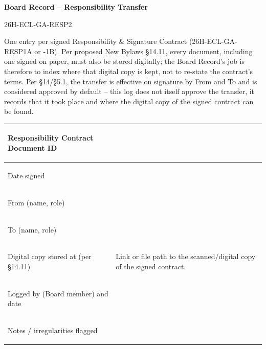 \documentclass{../../../Common/Latex/Templates/rapport}
\date{\meetingdate, \meetingtime}
\begin{document}
\reportmainmatter
\small
\setlength{\parindent}{0pt}
\setlength{\tabcolsep}{6pt}
\renewcommand{\arraystretch}{1.2}

\begin{center}
  {\Large\bfseries Board Record -- Responsibility Transfer}\par
  \vspace{0.15cm}
  {\normalsize 26H-ECL-GA-RESP2}\par
  \vspace{0.1cm}
  {\small \meetingline}\par
\end{center}

\vspace{0.2cm}
One entry per signed Responsibility \& Signature Contract (26H-ECL-GA-RESP1A or -1B). Per proposed New Bylaws \S14.11, every document, including one signed on paper, must also be stored digitally; the Board Record's job is therefore to index where that digital copy is kept, not to re-state the contract's terms. Per \S14/\S5.1, the transfer is effective on signature by From and To and is considered approved by default -- this log does not itself approve the transfer, it records that it took place and where the digital copy of the signed contract can be found.

\vspace{0.4cm}
\begin{tabularx}{\textwidth}{|>{\bfseries\raggedright\arraybackslash}p{4.4cm}|X|}
  \hline
  Responsibility Contract Document ID & \rule{0pt}{1cm}   \\
  \hline
  Date signed                         & \rule{0pt}{0.9cm} \\
  \hline
  From (name, role)                   & \rule{0pt}{0.9cm} \\
  \hline
  To (name, role)                     & \rule{0pt}{0.9cm} \\
  \hline
  Digital copy stored at (per \S14.11) & \rule{0pt}{1.2cm}Link or file path to the scanned/digital copy of the signed contract. \\
  \hline
  Logged by (Board member) and date   & \rule{0pt}{1.2cm} \\
  \hline
  Notes / irregularities flagged      & \rule{0pt}{1.6cm} \\
  \hline
\end{tabularx}
\end{document}
